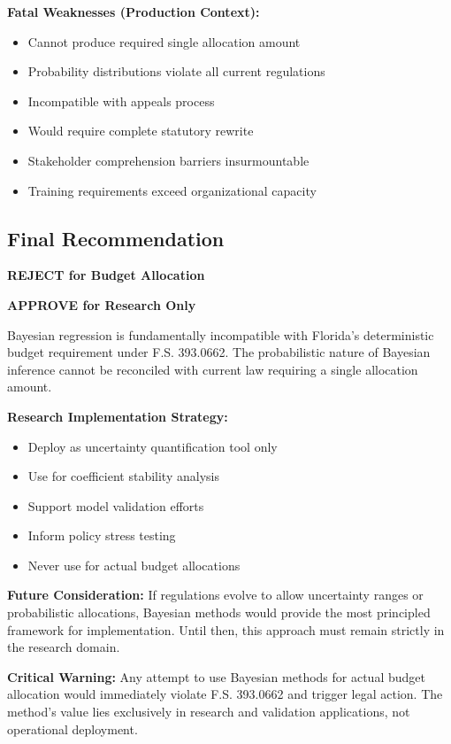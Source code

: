 \textbf{Fatal Weaknesses (Production Context):}
\begin{itemize}
    \item Cannot produce required single allocation amount
    \item Probability distributions violate all current regulations
    \item Incompatible with appeals process
    \item Would require complete statutory rewrite
    \item Stakeholder comprehension barriers insurmountable
    \item Training requirements exceed organizational capacity
\end{itemize}

\subsection{Final Recommendation}

\textbf{REJECT for Budget Allocation}

\textbf{APPROVE for Research Only}

Bayesian regression is fundamentally incompatible with Florida's deterministic budget requirement under F.S. 393.0662. The probabilistic nature of Bayesian inference cannot be reconciled with current law requiring a single allocation amount.

\textbf{Research Implementation Strategy:}
\begin{itemize}
    \item Deploy as uncertainty quantification tool only
    \item Use for coefficient stability analysis
    \item Support model validation efforts
    \item Inform policy stress testing
    \item Never use for actual budget allocations
\end{itemize}

\textbf{Future Consideration:} If regulations evolve to allow uncertainty ranges or probabilistic allocations, Bayesian methods would provide the most principled framework for implementation. Until then, this approach must remain strictly in the research domain.

\textbf{Critical Warning:} Any attempt to use Bayesian methods for actual budget allocation would immediately violate F.S. 393.0662 and trigger legal action. The method's value lies exclusively in research and validation applications, not operational deployment.